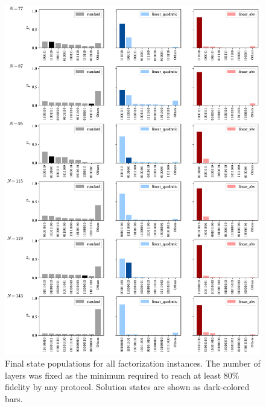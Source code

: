 \begin{figure}[H]
    \centering
    \includegraphics[width=1\textwidth]{06-appendix/figs/populations_all2.pdf}
    \caption{Final state populations for all factorization instances. The number
    of layers was fixed as the minimum required to reach at least 80\% fidelity by any
    protocol. Solution states are shown as dark-colored bars.}
    \label{fig:populations_all}
\end{figure}